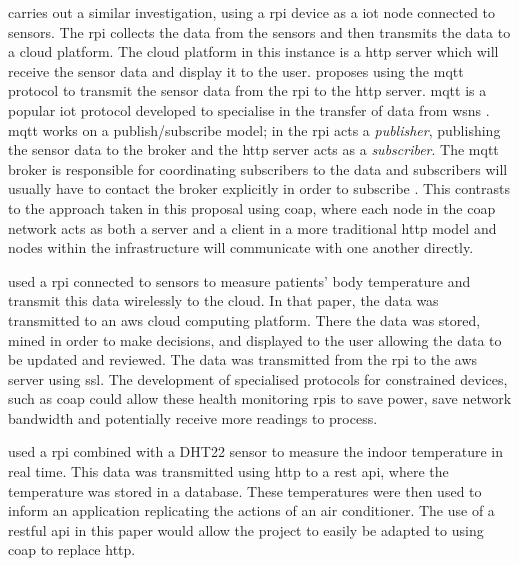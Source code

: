 \citet{rode_iot_2017} carries out a similar investigation, using a \gls{rpi} 
device as a \gls{iot} node connected to sensors. The \gls{rpi} collects the 
data from the sensors and then transmits the data to a cloud platform. The 
cloud platform in this instance is a \gls{http} server which will receive the
sensor data and display it to the user. \citet{rode_iot_2017} proposes using the 
\gls{mqtt} protocol to transmit the sensor data from the \gls{rpi} to the
\gls{http} server.
\gls{mqtt} is a popular \gls{iot} protocol developed to specialise in the transfer
of data from \glspl{wsn} \citep{hunkeler_mqtt-s_2008}. \gls{mqtt} works on a 
publish/subscribe model; in \citet{rode_iot_2017} the \gls{rpi} acts a \textit{publisher}, 
publishing the sensor data to the broker and the \gls{http} server acts as a
\textit{subscriber}. The \gls{mqtt} broker is responsible for coordinating subscribers 
to the data and subscribers will usually have to contact the broker explicitly in 
order to subscribe \citep{hunkeler_mqtt-s_2008}.
This contrasts to the approach taken in this proposal using \gls{coap}, where each
node in the \gls{coap} network acts as both a server and a client in a more traditional
\gls{http} model and nodes within the infrastructure will communicate with one
another directly.

\citet{jassas_smart_2015} used a \gls{rpi} connected to sensors to measure 
patients' body temperature and transmit this data wirelessly to the cloud.
In that paper, the data was transmitted to an \gls{aws} cloud computing platform.
There the data was stored, mined in order to make decisions, 
and displayed to the user allowing the data to be updated and reviewed.
The data was transmitted from the \gls{rpi} to the \gls{aws} server using \gls{ssl}.
The development of specialised protocols for constrained devices, such as \gls{coap}
could allow these health monitoring \glspl{rpi} to save power,
save network bandwidth and potentially receive more readings to process.

\citet{lee_internet_2018} used a \gls{rpi} combined with a DHT22 sensor to measure
the indoor temperature in real time. This data was transmitted using \gls{http}
to a \gls{rest} \gls{api}, where the temperature was stored in a database.
These temperatures were then used to inform an application replicating 
the actions of an air conditioner. The use of a \gls{rest}ful \gls{api} in 
this paper would allow the project to easily be adapted to using \gls{coap} 
to replace \gls{http}.